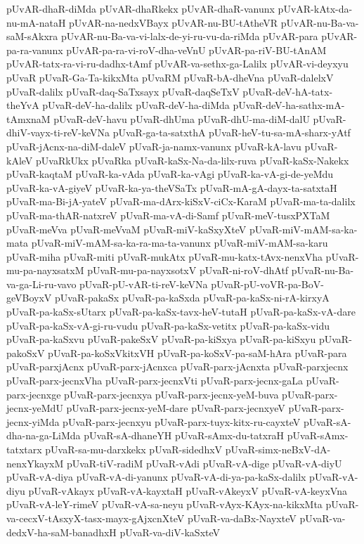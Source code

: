 {pUvAR-dhaR-diMda
pUvAR-dhaRkekx
pUvAR-dhaR-vanunx
pUvAR-kAtx-da-nu-mA-nataH
pUvAR-na-nedxVBayx
pUvAR-nu-BU-tAtheVR
pUvAR-nu-Ba-va-saM-sAkxra
pUvAR-nu-Ba-va-vi-lalx-de-yi-ru-vu-da-riMda
pUvAR-para
pUvAR-pa-ra-vanunx
pUvAR-pa-ra-vi-roV-dha-veVnU
pUvAR-pa-riV-BU-tAnAM
pUvAR-tatx-ra-vi-ru-dadhx-tAmf
pUvAR-va-sethx-ga-Lalilx
pUvAR-vi-deyxyu
pUvaR
pUvaR-Ga-Ta-kikxMta
pUvaRM
pUvaR-bA-dheVna
pUvaR-dalelxV
pUvaR-dalilx
pUvaR-daq-SaTxsayx
pUvaR-daqSeTxV
pUvaR-deV-hA-tatx-theYvA
pUvaR-deV-ha-dalilx
pUvaR-deV-ha-diMda
pUvaR-deV-ha-sathx-mA-tAmxnaM
pUvaR-deV-havu
pUvaR-dhUma
pUvaR-dhU-ma-diM-dalU
pUvaR-dhiV-vayx-ti-reV-keVNa
pUvaR-ga-ta-satxthA
pUvaR-heV-tu-sa-mA-sharx-yAtf
pUvaR-jAcnx-na-diM-daleV
pUvaR-ja-namx-vanunx
pUvaR-kA-lavu
pUvaR-kAleV
pUvaRkUkx
pUvaRka
pUvaR-kaSx-Na-da-lilx-ruva
pUvaR-kaSx-Nakekx
pUvaR-kaqtaM
pUvaR-ka-vAda
pUvaR-ka-vAgi
pUvaR-ka-vA-gi-de-yeMdu
pUvaR-ka-vA-giyeV
pUvaR-ka-ya-theVSaTx
pUvaR-mA-gA-dayx-ta-satxtaH
pUvaR-ma-Bi-jA-yateV
pUvaR-ma-dArx-kiSxV-ciCx-KaraM
pUvaR-ma-ta-dalilx
pUvaR-ma-thAR-natxreV
pUvaR-ma-vA-di-Samf
pUvaR-meV-tusxPXTaM
pUvaR-meVva
pUvaR-meVvaM
pUvaR-miV-kaSxyXteV
pUvaR-miV-mAM-sa-ka-mata
pUvaR-miV-mAM-sa-ka-ra-ma-ta-vanunx
pUvaR-miV-mAM-sa-karu
pUvaR-miha
pUvaR-miti
pUvaR-mukAtx
pUvaR-mu-katx-tAvx-nenxVha
pUvaR-mu-pa-nayxsatxM
pUvaR-mu-pa-nayxsotxV
pUvaR-ni-roV-dhAtf
pUvaR-nu-Ba-va-ga-Li-ru-vavo
pUvaR-pU-vAR-ti-reV-keVNa
pUvaR-pU-voVR-pa-BoV-geVBoyxV
pUvaR-pakaSx
pUvaR-pa-kaSxda
pUvaR-pa-kaSx-ni-rA-kirxyA
pUvaR-pa-kaSx-sUtarx
pUvaR-pa-kaSx-tavx-heV-tutaH
pUvaR-pa-kaSx-vA-dare
pUvaR-pa-kaSx-vA-gi-ru-vudu
pUvaR-pa-kaSx-vetitx
pUvaR-pa-kaSx-vidu
pUvaR-pa-kaSxvu
pUvaR-pakeSxV
pUvaR-pa-kiSxya
pUvaR-pa-kiSxyu
pUvaR-pakoSxV
pUvaR-pa-koSxVkitxVH
pUvaR-pa-koSxV-pa-saM-hAra
pUvaR-para
pUvaR-parxjAcnx
pUvaR-parx-jAcnxca
pUvaR-parx-jAcnxta
pUvaR-parxjecnx
pUvaR-parx-jecnxVha
pUvaR-parx-jecnxVti
pUvaR-parx-jecnx-gaLa
pUvaR-parx-jecnxge
pUvaR-parx-jecnxya
pUvaR-parx-jecnx-yeM-buva
pUvaR-parx-jecnx-yeMdU
pUvaR-parx-jecnx-yeM-dare
pUvaR-parx-jecnxyeV
pUvaR-parx-jecnx-yiMda
pUvaR-parx-jecnxyu
pUvaR-parx-tuyx-kitx-ru-cayxteV
pUvaR-sA-dha-na-ga-LiMda
pUvaR-sA-dhaneYH
pUvaR-sAmx-du-tatxraH
pUvaR-sAmx-tatxtarx
pUvaR-sa-mu-darxkekx
pUvaR-sidedhxV
pUvaR-simx-neBxV-dA-nenxYkayxM
pUvaR-tiV-radiM
pUvaR-vAdi
pUvaR-vA-dige
pUvaR-vA-diyU
pUvaR-vA-diya
pUvaR-vA-di-yanunx
pUvaR-vA-di-ya-pa-kaSx-dalilx
pUvaR-vA-diyu
pUvaR-vAkayx
pUvaR-vA-kayxtaH
pUvaR-vAkeyxV
pUvaR-vA-keyxVna
pUvaR-vA-leY-rimeV
pUvaR-vA-sa-neyu
pUvaR-vAyx-KAyx-na-kikxMta
pUvaR-va-cecxV-tAsxyX-tasx-mayx-gAjxcnXteV
pUvaR-va-daBx-NayxteV
pUvaR-va-dedxV-ha-saM-banadhxH
pUvaR-va-diV-kaSxteV
}
